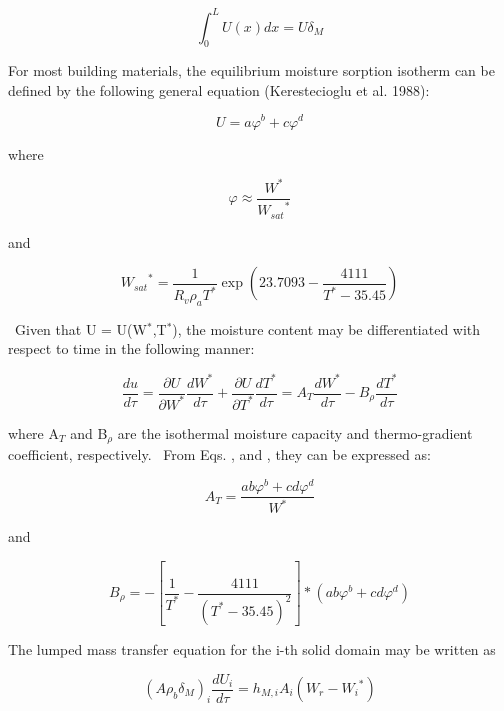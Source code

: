 \begin{equation}
\int_0^L {U(x)dx = U{\delta_M}}
\end{equation}

For most building materials, the equilibrium moisture sorption isotherm can be defined by the following general equation (Kerestecioglu et al. 1988):

\begin{equation}
U = a{\varphi ^b} + c{\varphi ^d}
\end{equation}

where

\begin{equation}
\varphi  \approx \frac{{{W^*}}}{{{W_{sat}}^*}}
\end{equation}

and

\begin{equation}
{W_{sat}}^* = \frac{1}{{{R_v}{\rho_a}{T^*}}}\exp \left( {23.7093 - \frac{{4111}}{{{T^*} - 35.45}}} \right)
\end{equation}

~Given that U = U(W\(^{*}\),T\(^{*}\)), the moisture content may be differentiated with respect to time in the following manner:

\begin{equation}
\frac{{du}}{{d\tau }} = \frac{{\partial U}}{{\partial {W^*}}}\frac{{d{W^*}}}{{d\tau }} + \frac{{\partial U}}{{\partial {T^*}}}\frac{{d{T^*}}}{{d\tau }} = {A_T}\frac{{d{W^*}}}{{d\tau }} - {B_\rho }\frac{{d{T^*}}}{{d\tau }}
\end{equation}

where A\(_{T}\) and B\(_{\rho}\) are the isothermal moisture capacity and thermo-gradient coefficient, respectively.~ From Eqs. , and , they can be expressed as:

\begin{equation}
{A_T} = \frac{{ab{\varphi ^b} + cd{\varphi ^d}}}{{{W^*}}}
\end{equation}

and

\begin{equation}
{B_\rho } =  - \left[ {\frac{1}{{{T^*}}} - \frac{{4111}}{{{{({T^*} - 35.45)}^2}}}} \right]*(ab{\varphi ^b} + cd{\varphi ^d})
\end{equation}

The lumped mass transfer equation for the i-th solid domain may be written as

\begin{equation}
{(A{\rho_b}{\delta_M})_i}\frac{{d{U_i}}}{{d\tau }} = {h_{M,i}}{A_i}({W_r} - {W_i}^*)
\end{equation}

